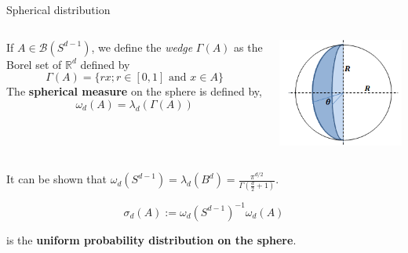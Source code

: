 \documentclass[handout, 10pt]{beamer} %
\begin{document}
  \begin{frame}{Spherical distribution}

    \begin{columns}
      \begin{column}{0.75\textwidth}

        \begin{definition}
          If $A \in \mathcal{B}\left(S^{d-1}\right)$, we define the \emph{wedge}
          $\Gamma(A)$ as the Borel set
          of $\mathbb{R}^{d}$ defined by
          $$
          \Gamma(A)=\{r x ; r \in[0,1] \text { and } x \in A\}
          $$
          \pause
          The \textbf{spherical measure} on the sphere is defined by,
          $$
          \omega_{d}(A)=\lambda_{d}(\Gamma(A))
          $$
        \end{definition}
      \end{column}
      \pause
      \begin{column}{0.25\textwidth}  %
        \begin{center}
          \includegraphics[width=1\textwidth]{wedge.png}
        \end{center}
      \end{column}
    \end{columns}

    \pause

    It can be shown that $\omega_d(S^{d-1}) = \lambda_d(B^d)  = \frac{\pi^{d /
        2}}{\Gamma\left(\frac{d}{2} + 1\right)} $.
    \pause

    \begin{equation*}
      \sigma_{d}(A):= \omega_d(S^{d-1})^{-1} \omega_d(A)
    \end{equation*}

    is the \textbf{uniform probability distribution on the sphere}.

  \end{frame}
\end{document}
